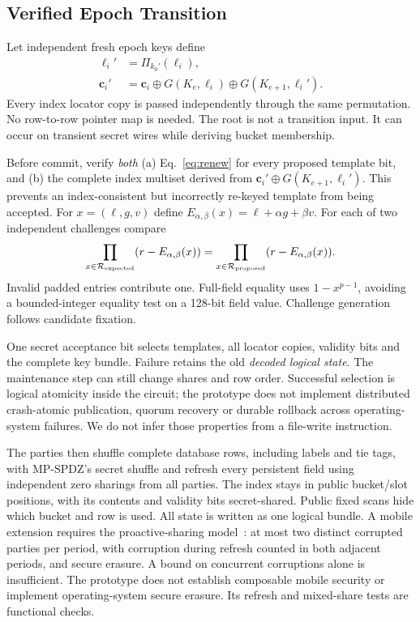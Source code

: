 \documentclass[journal]{IEEEtran}
\begin{document}
\subsection{Verified Epoch Transition}
Let independent fresh epoch keys define
\begin{align}
\ell_i'&=\Pi_{k_0'}(\ell_i),\\
\mathbf c_i'&=\mathbf c_i\oplus G(K_e,\ell_i)\oplus G(K_{e+1},\ell_i').\label{eq:renew}
\end{align}
Every index locator copy is passed independently through the same permutation. No row-to-row pointer map is needed. The root is not a transition input. It can occur on transient secret wires while deriving bucket membership.

Before commit, verify \emph{both} (a) Eq.~\eqref{eq:renew} for every proposed template bit, and (b) the complete index multiset derived from $\mathbf c_i'\oplus G(K_{e+1},\ell_i')$. This prevents an index-consistent but incorrectly re-keyed template from being accepted. For $x=(\ell,g,v)$ define $E_{\alpha,\beta}(x)=\ell+\alpha g+\beta v$. For each of two independent challenges compare
\begin{equation}
\prod_{x\in\mathcal R_{\rm expected}}(r-E_{\alpha,\beta}(x))
=\prod_{x\in\mathcal R_{\rm proposed}}(r-E_{\alpha,\beta}(x)).
\end{equation}
Invalid padded entries contribute one. Full-field equality uses $1-x^{p-1}$, avoiding a bounded-integer equality test on a 128-bit field value. Challenge generation follows candidate fixation.

One secret acceptance bit selects templates, all locator copies, validity bits and the complete key bundle. Failure retains the old \emph{decoded logical state}. The maintenance step can still change shares and row order. Successful selection is logical atomicity inside the circuit; the prototype does not implement distributed crash-atomic publication, quorum recovery or durable rollback across operating-system failures. We do not infer those properties from a file-write instruction.

The parties then shuffle complete database rows, including labels and tie tags, with MP-SPDZ's secret shuffle and refresh every persistent field using independent zero sharings from all parties. The index stays in public bucket/slot positions, with its contents and validity bits secret-shared. Public fixed scans hide which bucket and row is used. All state is written as one logical bundle. A mobile extension requires the proactive-sharing model~\cite{herzberg1995proactive}: at most two distinct corrupted parties per period, with corruption during refresh counted in both adjacent periods, and secure erasure. A bound on concurrent corruptions alone is insufficient. The prototype does not establish composable mobile security or implement operating-system secure erasure. Its refresh and mixed-share tests are functional checks.
\end{document}
